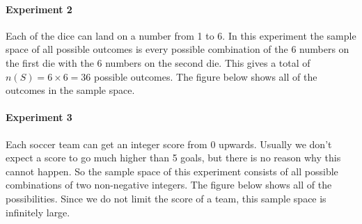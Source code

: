 \documentclass[a4paper,11pt]{report}
\begin{document}
\paragraph{Experiment 2} Each of the dice can land on a number from 1
to 6. In this experiment the sample space of all possible outcomes is
every possible combination of the 6 numbers on the first die with the
6 numbers on the second die. This gives a total of \(n(S) = 6 \times 6
= 36\) possible outcomes. The figure below shows all of the outcomes
in the sample space.

\begin{center}
\end{center}

\paragraph{Experiment 3} Each soccer team can get an integer score
from 0 upwards. Usually we don't expect a score to go much higher than
5 goals, but there is no reason why this cannot happen. So the sample
space of this experiment consists of all possible combinations of two
non-negative integers. The figure below shows all of the
possibilities. Since we do not limit the score of a team, this sample
space is infinitely large.

\begin{center}
\end{center}
\end{document}
